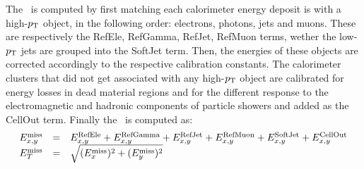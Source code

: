 The \met\ is computed by first matching each calorimeter energy 
deposit is with a high-$\pt$ object,  in the following order: electrons, photons, jets and muons.
These are respectively the RefEle, RefGamma, RefJet, RefMuon terms, wether the low-$\pt$ jets
are grouped into the SoftJet term. Then, the energies of these objects are
corrected accordingly to the respective calibration constants. 
The calorimeter clusters
that did not get associated with any  high-$\pt$ object are calibrated for energy losses in 
dead material regions and for the different response to the electromagnetic and hadronic
components of particle showers and added as the CellOut term. 
Finally the \met\ is computed as:
\begin{equation}\label{eq:met}
\begin{array}{lcl}
E^{\rm miss}_{x,y} & = & E^{\rm RefEle}_{x,y} + E^{\rm RefGamma}_{x,y} + E^{\rm RefJet}_{x,y} + E^{\rm RefMuon}_{x,y} + E^{\rm SoftJet}_{x,y} + E^{\rm CellOut}_{x,y}\\
E^{\rm miss}_{T} & = & \sqrt{(E^{\rm miss}_{x})^2 + (E^{\rm miss}_{y})^2}\\
\end{array}	\end{equation}

